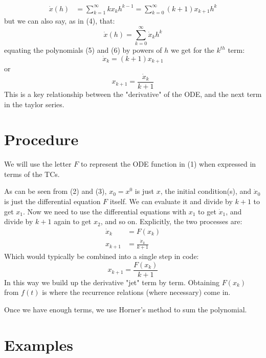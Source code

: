 \documentclass[11pt]{article}
\begin{document}
\begin{equation}
\begin{aligned}
\dot{x}(h) &= \sum_{k=1}^{\infty} k x_kh^{k-1} = \sum_{k=0}^{\infty} (k + 1) x_{k+1}h^k
\end{aligned}
\end{equation}
but we can also say, as in (4), that:
\begin{equation}
\dot{x}(h) = \sum_{k=0}^{\infty} \dot{x}_kh^k
\end{equation}
equating the polynomials (5) and (6) by powers of $h$ we get for the $k^{th}$ term:
\begin{equation}
\dot{x}_k = (k + 1) x_{k+1}
\end{equation}
or
\begin{equation}
x_{k+1} = \frac{\dot{x}_k} {k + 1} 
\end{equation}
This is a key relationship between the "derivative" of the ODE, and the next term in the taylor series.
\section{Procedure}
We will use the letter $F$ to represent the ODE function in (1) when expressed in terms of the TCs.

As can be seen from (2) and (3), $x_0 = x^0$ is just $x$, the initial condition(s), and $\dot{x}_0$ is just the differential equation $F$ itself.
We can evaluate it and divide by $k + 1$ to get $x_1$.
Now we need to use the differential equations with $x_1$ to get $\dot{x}_1$, and divide by $k + 1$ again to get $x_2$, and so on.  Explicitly, the two processes are:
\begin{equation}
\begin{aligned}
\dot{x}_k &= F(x_k) \\
x_{k+1} &= \frac{\dot{x}_k} {k + 1}
\end{aligned}
\end{equation}
Which would typically be combined into a single step in code:
\begin{equation}
x_{k+1} = \frac{F(x_k)} {k + 1}
\end{equation}
In this way we build up the derivative "jet" term by term.
Obtaining $F(x_k)$ from $f(t)$ is where the recurrence relations (where necessary) come in.

Once we have enough terms, we use Horner's method to sum the polynomial.
\section{Examples}
\end{document}
